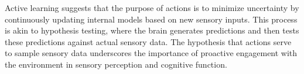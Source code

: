\documentclass[10pt,letterpaper]{article}
\begin{document}
{\color{gray}
Active learning suggests that the purpose of actions is to minimize uncertainty by continuously updating internal models based on new sensory inputs. This process is akin to hypothesis testing, where the brain generates predictions and then tests these predictions against actual sensory data. %
The hypothesis that actions serve to sample sensory data underscores the importance of proactive engagement with the environment in sensory perception and cognitive function. 
}

\linenumbers



\end{document}
